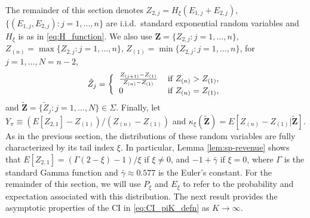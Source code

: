The remainder of this section denotes $ Z_{2,j}=H_{\xi }(E_{1,j}+E_{2,j})$, $ \{(E_{1,j},E_{2,j}):j=1,\dots ,n\}$ are i.i.d.\ standard exponential random variables and $H_{\xi }$ is as in \eqref{eq:H_function}. We also use $ \mathbf{Z}=\{Z_{2,j}:j=1,\dots ,n\}$, $Z_{(n)}=\max \{Z_{2,j}:j=1,\dots ,n\}$, $Z_{(1)}=\min \{Z_{2,j}:j=1,\dots ,n\}$, for $j=1,\ldots ,N=n-2$,
\begin{equation*}
\tilde{Z}_{j}=\bigg\{
\begin{tabular}{ll}
$\frac{Z_{( j+1) }-Z_{(1)}}{Z_{(n)}-Z_{(1)}}$ & if $ Z_{(n)}>Z_{(1)},$ \\
$0$ & if $Z_{(n)}=Z_{(1)},$
\end{tabular}
\end{equation*}
and $\mathbf{\tilde{Z}}=\{\tilde{Z}_{j}:j=1,\dots ,N\} \in \Sigma $. Finally, let $Y_{\pi }\equiv (E[Z_{2,1}] - Z_{(1)}) /(Z_{(n)}-Z_{(1)})$ and $\kappa _{\xi }(\mathbf{\tilde{Z}} )=E[Z_{(n)}-Z_{(1)}|\mathbf{\tilde{Z}}]$. As in the previous section, the distributions of these random variables are fully characterized by its tail index $\xi $. In particular, Lemma \ref{lem:sp-revenue} shows that $E[Z_{2,1}] = (\Gamma(2-\xi)-1)/\xi$ if $\xi \neq 0$, and $-1+\bar{\gamma}$ if $\xi =0$, where $\Gamma$ is the standard Gamma function and $\bar{\gamma}\approx 0.577$ is the Euler's constant. For the remainder of this section, we will use $P_{\xi}$ and $E_{\xi}$ to refer to the probability and expectation associated with this distribution.
The next result provides the asymptotic properties of the CI in \eqref{eq:CI_piK_defn} as $K\to \infty$. 
